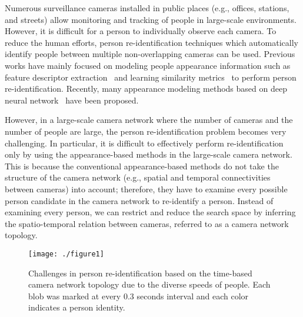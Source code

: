 \documentclass[10pt,twocolumn,letterpaper]{article}
\begin{document}
	Numerous surveillance cameras installed in public places (e.g., offices, stations, and streets) allow monitoring and tracking of people in large-scale environments.
	However, it is difficult for a person to individually observe each camera. To reduce the human efforts, person re-identification techniques which automatically identify people between multiple non-overlapping cameras can be used.
	Previous works have mainly focused on modeling people appearance information such as feature descriptor extraction~\cite{farenzena2010person, liu2012person} and learning similarity metrics~\cite{koestinger2012large,dikmen2011pedestrian} to perform person re-identification.
	Recently, many appearance modeling methods based on deep neural network~\cite{ahmed2015improved, yi2014deep} have been proposed.
	
	However, in a large-scale camera network where the number of cameras and the number of people are large, the person re-identification problem becomes very challenging. 
	In particular, it is difficult to effectively perform re-identification only by using the appearance-based methods in the large-scale camera network.
	This is because the conventional appearance-based methods do not take the structure of the camera network (e.g., spatial and temporal connectivities between cameras) into account; therefore, they have to examine every possible person candidate in the camera network to re-identify a person. 
	Instead of examining every person, we can restrict and reduce the search space by inferring the spatio-temporal relation between cameras, referred to as a camera network topology.
	
	\begin{figure}[t]	
		\centering
		\texttt{[image: ./figure1]}
		\caption{Challenges in person re-identification based on the time-based camera network topology due to the diverse speeds of people. Each blob was marked at every 0.3 seconds interval and each color indicates a person identity.}
		\label{fig_1}
		\vspace{-10pt}
	\end{figure}
	
\end{document}
